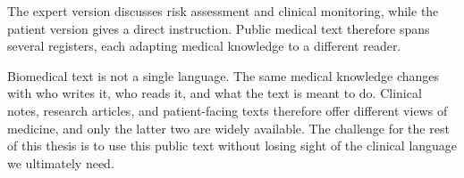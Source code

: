 \begin{reviewread}
The expert version discusses risk assessment and clinical monitoring, while the patient version gives a direct instruction.
Public medical text therefore spans several registers, each adapting medical knowledge to a different reader.
\end{reviewread}

\begin{reviewread}
Biomedical text is not a single language.
The same medical knowledge changes with who writes it, who reads it, and what the text is meant to do.
Clinical notes, research articles, and patient-facing texts therefore offer different views of medicine, and only the latter two are widely available.
The challenge for the rest of this thesis is to use this public text without losing sight of the clinical language we ultimately need.
\end{reviewread}
